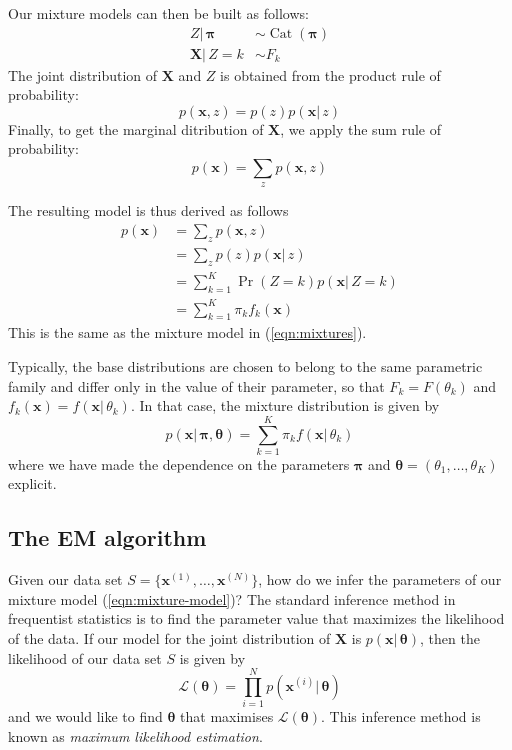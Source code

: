 \documentclass[final,3p,times,twocolumn]{elsarticle}
\DeclareMathOperator*{\Cat}{Cat}
\let\bs\boldsymbol
\begin{document}
Our mixture models can then be built as follows:
\begin{equation}
\begin{split}
\label{eqn:mixture-lvm}
Z|\,\bs\pi &\sim \Cat(\bs\pi)\\
\bs X |\,Z=k &\sim F_k
\end{split}
\end{equation}
The joint distribution of $\bs X$ and $Z$ is obtained from the product rule of probability:
\begin{equation*}
p(\bs x, z) = p(z)p(\bs x|\,z)
\end{equation*}
Finally, to get the marginal ditribution of $\bs X$, we apply the sum rule of probability:
\begin{equation}
\label{eqn:sum-rule}
p(\bs x) = \sum_z p(\bs x, z)
\end{equation}

The resulting model is thus derived as follows
\begin{equation*}
\begin{split}
p(\bs x) &= \sum_z p(\bs x, z)\\
&= \sum_z p(z)p(\bs x|\,z)\\
&= \sum_{k=1}^K \Pr(Z=k) p(\bs x|\,Z=k)\\
&= \sum_{k=1}^K \pi_k f_k(\bs x)
\end{split}
\end{equation*}
This is the same as the mixture model in (\ref{eqn:mixtures}).

Typically, the base distributions are chosen to belong to the same parametric family and differ only in the value of their parameter, so that $F_k=F(\theta_k)$ and $f_k(\bs x) = f(\bs x|\, \theta_k)$.
In that case, the mixture distribution is given by
\begin{equation}
\label{eqn:mixture-model}
p(\bs x|\,\bs\pi,\bs\theta) = \sum_{k=1}^K \pi_k f(\bs x|\,\theta_k)
\end{equation}
where we have made the dependence on the parameters $\bs\pi$ and $\bs\theta = (\theta_1,\dots,\theta_K)$ explicit.


\subsection{The EM algorithm}
\label{sect:EM}
Given our data set $S=\{\bs x^{(1)},\dots,\bs x^{(N)}\}$, how do we infer the parameters of our mixture model (\ref{eqn:mixture-model})?
The standard inference method in frequentist statistics is to find the parameter value that maximizes the likelihood of the data. 
If our model for the joint distribution of $\bs X$ is $p(\bs x|\,\bs\theta)$, then the likelihood of our data set $S$ is given by
\begin{equation*}
\mathcal{L}(\bs\theta) = \prod_{i=1}^N p(\bs x^{(i)}|\,\bs \theta)
\end{equation*}
and we would like to find $\bs \theta$ that maximises $\mathcal{L}(\bs\theta)$.
This inference method is known as \emph{maximum likelihood estimation}. 
\end{document}
